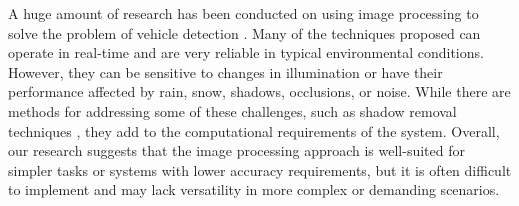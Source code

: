 A huge amount of research has been conducted on using image processing to solve
the problem of vehicle detection \cite{ImageProcessingOverview}. Many of the
techniques proposed can operate in real-time and are very reliable in typical
environmental conditions. However, they can be sensitive to changes in
illumination or have their performance affected by rain, snow, shadows,
occlusions, or noise. While there are methods for addressing some of these
challenges, such as shadow removal techniques \cite{ShadowRemoval}, they add to
the computational requirements of the system. Overall, our research suggests
that the image processing approach is well-suited for simpler tasks or systems
with lower accuracy requirements, but it is often difficult to implement and may
lack versatility in more complex or demanding scenarios.








